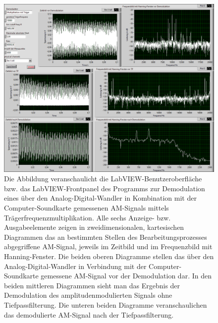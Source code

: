 \documentclass[
a4paper,
12pt,
pagesize,
ngerman
]{scrartcl}
\begin{document}
	\begin{figure}[H]
		\centering
		\includegraphics[width=1.0\textwidth]{EIRE2018Dateien/Tag4/traegerMultOszi/Oszilloskop__modifiziertp}
		\caption{Die Abbildung veranschaulicht die LabVIEW-Benutzeroberfläche bzw. das LabVIEW-Frontpanel des Programms zur Demodulation eines über den Analog-Digital-Wandler in Kombination mit der Computer-Soundkarte gemessenen AM-Signals mittels Trägerfrequenzmultiplikation. Alle sechs Anzeige- bzw. Ausgabeelemente zeigen in zweidimensionalen, kartesischen Diagrammen das an bestimmten Stellen des Bearbeitungsprozesses abgegriffene AM-Signal, jeweils im Zeitbild und im Frequenzbild mit Hanning-Fenster. Die beiden oberen Diagramme stellen das über den Analog-Digital-Wandler in Verbindung mit der Computer-Soundkarte gemessene AM-Signal vor der Demodulation dar. In den beiden mittleren Diagrammen sieht man das Ergebnis der Demodulation des amplitudenmodulierten Signals ohne Tiefpassfilterung. Die unteren beiden Diagramme veranschaulichen das demodulierte AM-Signal nach der Tiefpassfilterung.}
		\label{MultiTraegerFrontpanel}
	\end{figure}
\end{document}
